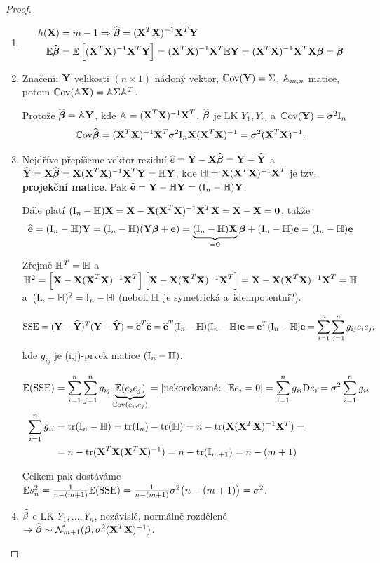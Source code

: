 \begin{proof}
\begin{enumerate}
\item
\begin{align*}
	h(\X) & = m - 1 \Rightarrow \wbetab = (\X^T \X)^{-1} \X^T \Y \\
	\E \wbetab & = \E \left[(\X^T \X)^{-1} \X^T \Y \right] = (\X^T \X)^{-1} \X^T \E\Y = (\X^T \X)^{-1} \X^T \X \betab = \betab
\end{align*}

\item
Značení: $\Y$ velikosti $(n \times 1)$ nádoný vektor, $\Cov(\Y) = \Sigma$, $\Am_{m, n}$ matice, potom $\Cov(\Am \X) = \Am \Sigma \Am^T$.

Protože $\wbetab = \Am \Y$, kde $\Am = (\X^T \X)^{-1} \X^T$, $\wbetab$ je LK $Y_1, Y_m$ a~$\Cov(\Y) = \sigma^2 \In$
 $$
	\Cov \wbetab = (\X^T \X)^{-1} \X^T \sigma^2 \In \X (\X^T \X)^{-1} = \sigma^2 (\X^T \X)^{-1}.
 $$

\item
Nejdříve přepíšeme vektor reziduí $\he = \Y - \X \wbetab = \Y - \hYb$ a~\\
 $\hYb = \X \wbetab = \X (\X^T \X)^{-1} \X^T \Y = \Hm \Y$, kde $\Hm = \X (\X^T \X)^{-1} \X^T$ je tzv. \textbf{projekční matice}. Pak $\heb = \Y - \Hm \Y = (\In - \Hm) \Y$.

Dále platí $(\In - \Hm) \X = \X - \X (\X^T \X)^{-1} \X^T \X = \X - \X = \boldsymbol{0}$, takže
 $$
	\heb = (\In - \Hm) \Y = (\In - \Hm)(\Y \betab + \eb) = \underbrace{(\In - \Hm) \X}_{ = \boldsymbol{0}} \betab + (\In - \Hm) \eb = (\In - \Hm) \eb
 $$

Zřejmě $\Hm^T = \Hm$ a~$\Hm^2 = \left[\X - \X (\X^T \X)^{-1} \X^T \right] \left[\X - \X (\X^T \X)^{-1} \X^T \right] = \X - \X (\X^T \X)^{-1} \X^T = \Hm$ a~$(\In - \Hm)^2 = \In - \Hm$ (neboli $\Hm$ je symetrická a~idempotentní?).

 $$
	\SSE = (\Y - \hYb)^T(\Y - \hYb) = \heb^T \heb = \heb^T (\In - \Hm)(\In - \Hm) \eb = \eb^T (\In - \Hm) \eb = \sum_{i = 1}^n \sumjn g_{ij} e_i e_j,
 $$
kde $g_{ij}$ je (i,j)-prvek matice $(\In - \Hm)$.

\begin{align*}
	\E(\SSE) & = \sum_{i = 1}^n \sumjn g_{ij} \underbrace{\E(e_i e_j)}_{\Cov(e_i, e_j)} = \left[\text{nekorelované: \;} \E e_i = 0 \right] = \sum_{i = 1}^n g_{ii} \D e_i = \sigma^2 \sum_{i = 1}^n g_{ii} \\
	\sum_{i = 1}^n g_{ii} & = \trace(\In - \Hm) = \trace(\In) - \trace(\Hm) = n - \trace(\X (\X^T \X)^{-1} \X^T) = \\
	& = n - \trace(\X^T \X (\X^T \X)^{-1}) = n - \trace(\Identita{m+1}) = n - (m + 1)
\end{align*}

Celkem pak dostáváme $\E s_n^2 = \frac{1}{n - (m + 1)} \E (\SSE) = \frac{1}{n - (m + 1)} \sigma^2\big(n - (m + 1)\big) = \sigma^2$.

\item
 $\wbeta$ e LK $Y_1,..., Y_n$, nezávislé, normálně rozdělené $\rightarrow \wbetab \sim \NN_{m+1} (\betab, \sigma^2(\X^T \X)^{-1})$.
\end{enumerate}
\end{proof}

